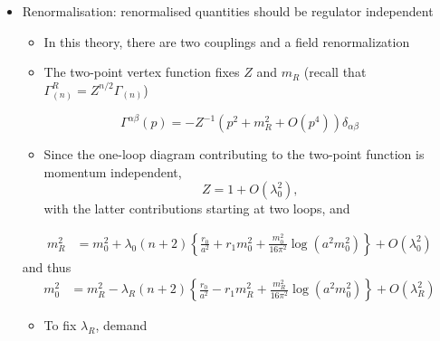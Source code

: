 \begin{itemize}
  \item Renormalisation: renormalised quantities should be regulator independent
  \begin{itemize}
      \item In this theory, there are two couplings and a field renormalization
      \item The two-point vertex function fixes $Z$ and $m_R$ (recall that $\Gamma^R_{(n)} = Z^{n/2}\Gamma_{(n)}$)
  \end{itemize}

\begin{equation}
    \Gamma^{\alpha \beta}(p) = - Z^{-1}(p^2 + m^2_R + O(p^4))\delta_{\alpha \beta}  
\end{equation}

    \begin{itemize}
        \item Since the one-loop diagram contributing to the two-point function is momentum independent, 
        \begin{equation}
            Z = 1 + O(\lambda_0^2),
        \end{equation}
        with the latter contributions starting at two loops, and
    \end{itemize}

\begin{align}
    m_R^2 &= m_0^2 + \lambda_0(n+2) \left\{\frac{r_0}{a^2} + r_1 m_0^2 + \frac{m_0^2}{16 \pi^2}\log(a^2 m_0^2) \right\} + O(\lambda_0^2)
\end{align}
and thus 
    \begin{align}
    m_0^2&= m_R^2 - \lambda_R(n+2) \left\{\frac{r_0}{a^2} - r_1 m_R^2 + \frac{m_R^2}{16 \pi^2}\log(a^2 m_0^2) \right\} + O(\lambda_R^2)
    \label{eq:m0vsmR}
\end{align}

\begin{itemize}
 \item To fix \(\lambda_{R}\), demand
\end{itemize}


\end{itemize}
